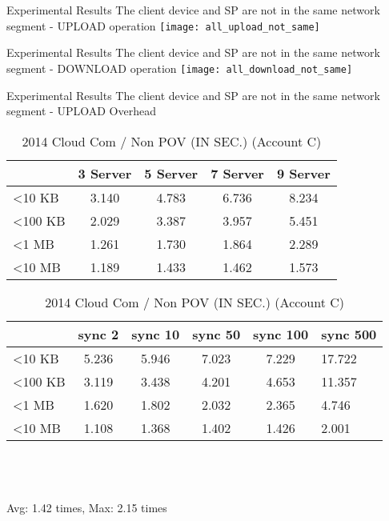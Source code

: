\begin{frame}{Experimental Results}
{The client device and SP are \alert{not} in the same network segment - UPLOAD operation}
	\texttt{[image: all\_upload\_not\_same]}
\end{frame}

\begin{frame}{Experimental Results}
{The client device and SP are \alert{not} in the same network segment - DOWNLOAD operation}
	\texttt{[image: all\_download\_not\_same]}
\end{frame}

\begin{frame}{Experimental Results}
{The client device and SP are \alert{not} in the same network segment - UPLOAD Overhead}
	\scriptsize
    \begin{table}[]
    \centering
    \caption{My Method / Non POV (IN SEC.) (Account C)}
    \begin{tabular}{lcccc}
                         & 3 Server & 5 Server & 7 Server & 9 Server \\ \hline
        \textless 10 KB  & 3.140 & 4.783 & 6.736 & 8.234 \\ \hline
        \textless 100 KB & 2.029 & 3.387 & 3.957 & 5.451 \\ \hline
        \textless 1 MB   & 1.261 & 1.730 & 1.864 & 2.289 \\ \hline
        \textless 10 MB  & 1.189 & 1.433 & 1.462 & 1.573 \\ \hline
    \end{tabular}
    \caption{2014 Cloud Com / Non POV (IN SEC.) (Account C)}
    \begin{tabular}{lccccl}
                         & sync 2   & sync 10  & sync 50  & sync 100 & sync 500 \\ \hline
        \textless 10 KB  & 5.236 & 5.946 & 7.023 & 7.229   & 17.722  \\ \hline
        \textless 100 KB & 3.119 & 3.438 & 4.201 & 4.653   & 11.357  \\ \hline
        \textless 1 MB   & 1.620 & 1.802 & 2.032 & 2.365   & 4.746   \\ \hline
        \textless 10 MB  & 1.108 & 1.368 & 1.402 & 1.426   & 2.001   \\ \hline
    \end{tabular}
    ~\\
    ~\\
    ~\\
    \alert{Avg: 1.42 times, Max: 2.15 times}
    \end{table}
\end{frame}

